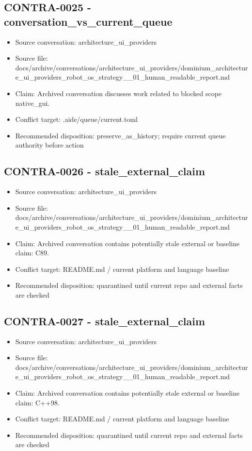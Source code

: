 \documentclass[11pt,a4paper]{report}
\begin{document}
\subsection{CONTRA-0025 - conversation\_vs\_current\_queue}

\begin{itemize}
\item Source conversation: architecture\_ui\_providers
\item Source file: docs/archive/conversations/architecture\_ui\_providers/dominium\_architecture\_ui\_providers\_robot\_os\_strategy\_\_01\_human\_readable\_report.md
\item Claim: Archived conversation discusses work related to blocked scope native\_gui.
\item Conflict target: .aide/queue/current.toml
\item Recommended disposition: preserve\_as\_history; require current queue authority before action
\end{itemize}

\subsection{CONTRA-0026 - stale\_external\_claim}

\begin{itemize}
\item Source conversation: architecture\_ui\_providers
\item Source file: docs/archive/conversations/architecture\_ui\_providers/dominium\_architecture\_ui\_providers\_robot\_os\_strategy\_\_01\_human\_readable\_report.md
\item Claim: Archived conversation contains potentially stale external or baseline claim: C89.
\item Conflict target: README.md / current platform and language baseline
\item Recommended disposition: quarantined until current repo and external facts are checked
\end{itemize}

\subsection{CONTRA-0027 - stale\_external\_claim}

\begin{itemize}
\item Source conversation: architecture\_ui\_providers
\item Source file: docs/archive/conversations/architecture\_ui\_providers/dominium\_architecture\_ui\_providers\_robot\_os\_strategy\_\_01\_human\_readable\_report.md
\item Claim: Archived conversation contains potentially stale external or baseline claim: C++98.
\item Conflict target: README.md / current platform and language baseline
\item Recommended disposition: quarantined until current repo and external facts are checked
\end{itemize}
\end{document}
